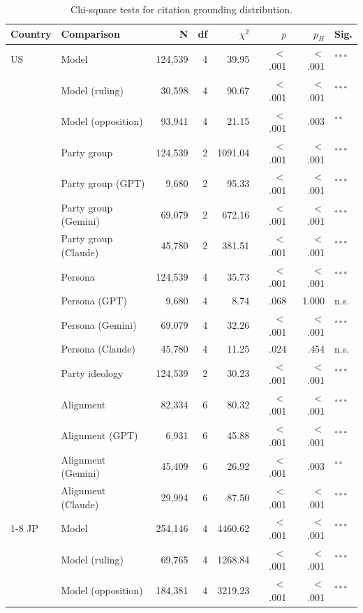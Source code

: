 \begin{table}[t]
\centering
\footnotesize
\setlength{\tabcolsep}{3pt}
\caption{Chi-square tests for citation grounding distribution.}
\label{tab:citation-grounding-distribution-tests}
\begin{tabular}{llrrrrrl}
\toprule
\textbf{Country} & \textbf{Comparison} & \textbf{N} & \textbf{df} & \textbf{$\chi^2$} & \textbf{$p$} & \textbf{$p_H$} & \textbf{Sig.} \\
\midrule
US & Model & 124{,}539 & 4 & 39.95 & $<$.001 & $<$.001 & $^{***}$ \\
 & Model (ruling) & 30{,}598 & 4 & 90.67 & $<$.001 & $<$.001 & $^{***}$ \\
 & Model (opposition) & 93{,}941 & 4 & 21.15 & $<$.001 & .003 & $^{**}$ \\
 & Party group & 124{,}539 & 2 & 1091.04 & $<$.001 & $<$.001 & $^{***}$ \\
 & Party group (GPT) & 9{,}680 & 2 & 95.33 & $<$.001 & $<$.001 & $^{***}$ \\
 & Party group (Gemini) & 69{,}079 & 2 & 672.16 & $<$.001 & $<$.001 & $^{***}$ \\
 & Party group (Claude) & 45{,}780 & 2 & 381.51 & $<$.001 & $<$.001 & $^{***}$ \\
 & Persona & 124{,}539 & 4 & 35.73 & $<$.001 & $<$.001 & $^{***}$ \\
 & Persona (GPT) & 9{,}680 & 4 & 8.74 & .068 & 1.000 & n.s. \\
 & Persona (Gemini) & 69{,}079 & 4 & 32.26 & $<$.001 & $<$.001 & $^{***}$ \\
 & Persona (Claude) & 45{,}780 & 4 & 11.25 & .024 & .454 & n.s. \\
 & Party ideology & 124{,}539 & 2 & 30.23 & $<$.001 & $<$.001 & $^{***}$ \\
 & Alignment & 82{,}334 & 6 & 80.32 & $<$.001 & $<$.001 & $^{***}$ \\
 & Alignment (GPT) & 6{,}931 & 6 & 45.88 & $<$.001 & $<$.001 & $^{***}$ \\
 & Alignment (Gemini) & 45{,}409 & 6 & 26.92 & $<$.001 & .003 & $^{**}$ \\
 & Alignment (Claude) & 29{,}994 & 6 & 87.50 & $<$.001 & $<$.001 & $^{***}$ \\
\cmidrule(lr){1-8}
JP & Model & 254{,}146 & 4 & 4460.62 & $<$.001 & $<$.001 & $^{***}$ \\
 & Model (ruling) & 69{,}765 & 4 & 1268.84 & $<$.001 & $<$.001 & $^{***}$ \\
 & Model (opposition) & 184{,}381 & 4 & 3219.23 & $<$.001 & $<$.001 & $^{***}$ \\

\end{tabular}
\end{table}
